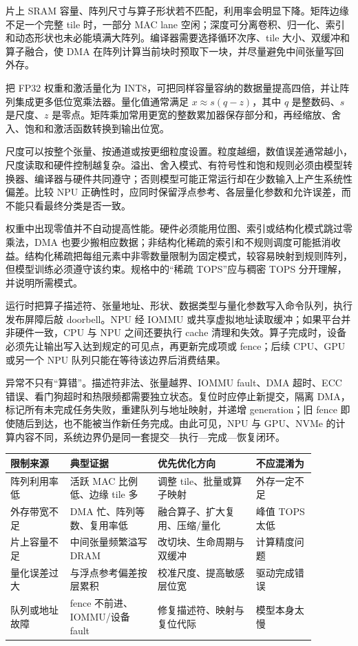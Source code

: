 片上 SRAM 容量、阵列尺寸与算子形状若不匹配，利用率会明显下降。矩阵边缘不足一个完整 tile 时，一部分 MAC lane 空闲；深度可分离卷积、归一化、索引和动态形状也未必能填满大阵列。编译器需要选择循环次序、tile 大小、双缓冲和算子融合，使 DMA 在阵列计算当前块时预取下一块，并尽量避免中间张量写回外存。


把 FP32 权重和激活量化为 INT8，可把同样容量容纳的数据量提高四倍，并让阵列集成更多低位宽乘法器。量化值通常满足 $x \approx s(q-z)$，其中 $q$ 是整数码、$s$ 是尺度、$z$ 是零点。矩阵乘加常用更宽的整数累加器保存部分和，再经缩放、舍入、饱和和激活函数转换到输出位宽。

尺度可以按整个张量、按通道或按更细粒度设置。粒度越细，数值误差通常越小，尺度读取和硬件控制越复杂。溢出、舍入模式、有符号性和饱和规则必须由模型转换器、编译器与硬件共同遵守；否则模型可能正常运行却在少数输入上产生系统性偏差。比较 NPU 正确性时，应同时保留浮点参考、各层量化参数和允许误差，而不能只看最终分类是否一致。


权重中出现零值并不自动提高性能。硬件必须能用位图、索引或结构化模式跳过零乘法，DMA 也要少搬相应数据；非结构化稀疏的索引和不规则调度可能抵消收益。结构化稀疏把每组元素中非零数量限制为固定模式，较容易映射到规则阵列，但模型训练必须遵守该约束。规格中的“稀疏 TOPS”应与稠密 TOPS 分开理解，并说明所需模式。


运行时把算子描述符、张量地址、形状、数据类型与量化参数写入命令队列，执行发布屏障后敲 doorbell。NPU 经 IOMMU 或共享虚拟地址读取缓冲；如果平台并非硬件一致，CPU 与 NPU 之间还要执行 cache 清理和失效。算子完成时，设备必须先让输出写入达到规定的可见点，再更新完成项或 fence；后续 CPU、GPU 或另一个 NPU 队列只能在等待该边界后消费结果。

异常不只有“算错”。描述符非法、张量越界、IOMMU fault、DMA 超时、ECC 错误、看门狗超时和热限频都需要独立状态。复位时应停止新提交，隔离 DMA，标记所有未完成任务失败，重建队列与地址映射，并递增 generation；旧 fence 即使随后到达，也不能被当作新任务完成。由此可见，NPU 与 GPU、NVMe 的计算内容不同，系统边界仍是同一套提交—执行—完成—恢复闭环。

\begin{longtable}{L{0.17\linewidth}L{0.25\linewidth}L{0.29\linewidth}L{0.17\linewidth}}
\toprule
限制来源 & 典型证据 & 优先优化方向 & 不应混淆为 \\
\midrule
阵列利用率低 & 活跃 MAC 比例低、边缘 tile 多 & 调整 tile、批量或算子映射 & 外存一定不足 \\\tablerowrule
外存带宽不足 & DMA 忙、阵列等数、复用率低 & 融合算子、扩大复用、压缩/量化 & 峰值 TOPS 太低 \\\tablerowrule
片上容量不足 & 中间张量频繁溢写 DRAM & 改切块、生命周期与双缓冲 & 计算精度问题 \\\tablerowrule
量化误差过大 & 与浮点参考偏差按层累积 & 校准尺度、提高敏感层位宽 & 驱动完成错误 \\\tablerowrule
队列或地址故障 & fence 不前进、IOMMU/设备 fault & 修复描述符、映射与复位代际 & 模型本身太慢 \\
\bottomrule
\end{longtable}
